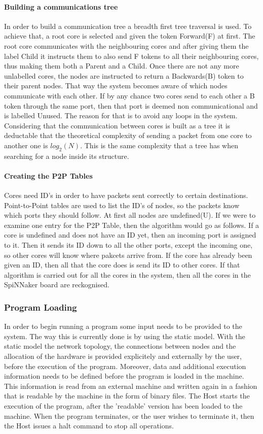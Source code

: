 \documentclass[12pt,a4paper]{article}
\begin{document}
\paragraph{Building a communications tree}
In order to build a communication tree a breadth first tree traversal is used. To achieve that, a root core is selected and given the token Forward(F) at first. The root core communicates with the neighbouring cores and after giving them the label Child it instructs them to also send F tokens to all their neighbouring cores, thus making them both a Parent and a Child. Once there are not any more unlabelled cores, the nodes are instructed to return a Backwards(B) token to their parent nodes. That way the system becomes aware of which nodes communicate with each other. If by any chance two cores send to each other a B token through the same port, then that port is deemed non communicational and is labelled Unused. The reason for that is to avoid any loops in the system\cite{jefflec}. Considering that the communication between cores is built as a tree it is deductable that the theoretical complexity of sending a packet from one core to another one is $log_2(N)$. This is the same complexity that a tree has when searching for a node inside its structure.
\paragraph{Creating the P2P Tables}
Cores need ID's in order to have packets sent correctly to certain destinations. Point-to-Point tables are used to list the ID's of nodes, so the packets know which ports they should follow. At first all nodes are undefined(U). If we were to examine one entry for the P2P Table, then the algorithm would go as follows. If a core is undefined and does not have an ID yet, then an incoming port is assigned to it. Then it sends its ID down to all the other ports, except the incoming one, so other cores will know where pakcets arrive from. If the core has already been given an ID, then all that the core does is send its ID to other cores. If that algorithm is carried out for all the cores in the system, then all the cores in the SpiNNaker board are reckognised\cite{jefflec}.

\subsubsection{Program Loading}
In order to begin running a program some input needs to be provided to the system. The way this is currently done is by using the static model. With the static model the network topology, the connections between nodes and the allocation of the hardware is provided explicitely and externally by the user, before the execution of the program. Moreover, data and additional execution information needs to be defined before the program is loaded in the machine. This information is read from an external machine and written again in a fashion that is readable by the machine in the form of binary files. The Host starts the execution of the program, after the 'readable' version has been loaded to the machine. When the program terminates, or the user wishes to terminate it, then the Host issues a halt command to stop all operations\cite{docfile}.
\end{document}
